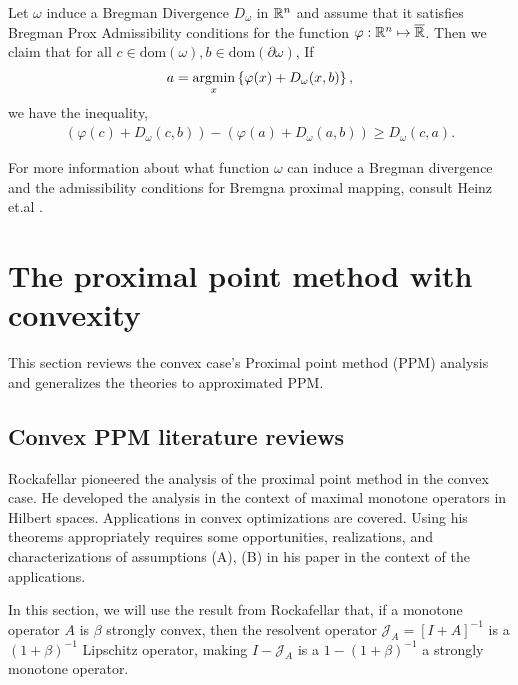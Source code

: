 \documentclass[12pt]{article}
\begin{document}
        \begin{theorem}\label{thm:ppm_breg_descent_ineq}
            Let $\omega$ induce a Bregman Divergence $D_\omega$ in $\mathbb R^n$ and assume that it satisfies Bregman Prox Admissibility conditions for the function $\varphi: \mathbb R^n \mapsto \overline {\mathbb R}$.
            Then we claim that for all $c \in \text{dom}(\omega), b \in \text{dom}(\partial \omega)$, 
            If 
            \begin{align*}
                a = \mathop{\rm argmin}\limits_{x}\left\lbrace
                \varphi(x) + D_\omega(x, b)
                \right\rbrace, 
            \end{align*}
            we have the inequality, 
            \begin{align*}
                (\varphi(c) + D_\omega(c, b)) - 
                (\varphi(a) + D_\omega(a, b)) \ge 
                D_\omega(c, a). 
            \end{align*}
        \end{theorem}
        \begin{remark}
            For more information about what function $\omega$ can induce a Bregman divergence and the admissibility conditions for Bremgna proximal mapping, consult Heinz et.al \cite{bauschke_descent_2017}. 
        \end{remark}


\section{The proximal point method with convexity}
    This section reviews the convex case's Proximal point method (PPM) analysis and generalizes the theories to approximated PPM. 
    \subsection{Convex PPM literature reviews}
        Rockafellar \cite{rockafellar_monotone_1976} pioneered the analysis of the proximal point method in the convex case. 
        He developed the analysis in the context of maximal monotone operators in Hilbert spaces. 
        Applications in convex optimizations are covered. 
        Using his theorems appropriately requires some opportunities, realizations, and characterizations of assumptions (A), (B) in his paper in the context of the applications. 
        \par\noindent
        In this section, we will use the result from Rockafellar that, if a monotone operator $A$ is $\beta$ strongly convex, then the resolvent operator $\mathcal J_A = [I + A]^{-1}$ is a $(1 + \beta)^{-1}$ Lipschitz operator, making $I - \mathcal J_A$ is a $1 - (1 + \beta)^{-1}$ a strongly monotone operator. 
        
\end{document}
